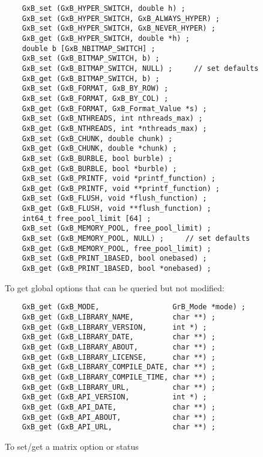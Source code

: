 \documentclass[12pt]{article}
\begin{document}
{    {\footnotesize
    \begin{verbatim}
    GxB_set (GxB_HYPER_SWITCH, double h) ;
    GxB_set (GxB_HYPER_SWITCH, GxB_ALWAYS_HYPER) ;
    GxB_set (GxB_HYPER_SWITCH, GxB_NEVER_HYPER) ;
    GxB_get (GxB_HYPER_SWITCH, double *h) ;
    double b [GxB_NBITMAP_SWITCH] ;
    GxB_set (GxB_BITMAP_SWITCH, b) ;
    GxB_set (GxB_BITMAP_SWITCH, NULL) ;     // set defaults
    GxB_get (GxB_BITMAP_SWITCH, b) ;
    GxB_set (GxB_FORMAT, GxB_BY_ROW) ;
    GxB_set (GxB_FORMAT, GxB_BY_COL) ;
    GxB_get (GxB_FORMAT, GxB_Format_Value *s) ;
    GxB_set (GxB_NTHREADS, int nthreads_max) ;
    GxB_get (GxB_NTHREADS, int *nthreads_max) ;
    GxB_set (GxB_CHUNK, double chunk) ;
    GxB_get (GxB_CHUNK, double *chunk) ;
    GxB_set (GxB_BURBLE, bool burble) ;
    GxB_get (GxB_BURBLE, bool *burble) ;
    GxB_set (GxB_PRINTF, void *printf_function) ;
    GxB_get (GxB_PRINTF, void **printf_function) ;
    GxB_set (GxB_FLUSH, void *flush_function) ;
    GxB_get (GxB_FLUSH, void **flush_function) ;
    int64_t free_pool_limit [64] ;
    GxB_set (GxB_MEMORY_POOL, free_pool_limit) ;
    GxB_set (GxB_MEMORY_POOL, NULL) ;     // set defaults
    GxB_get (GxB_MEMORY_POOL, free_pool_limit) ;
    GxB_set (GxB_PRINT_1BASED, bool onebased) ;
    GxB_get (GxB_PRINT_1BASED, bool *onebased) ; \end{verbatim} }

\noindent
To get global options that can be queried but not modified:

    {\footnotesize
    \begin{verbatim}
    GxB_get (GxB_MODE,                 GrB_Mode *mode) ;
    GxB_get (GxB_LIBRARY_NAME,         char **) ;
    GxB_get (GxB_LIBRARY_VERSION,      int *) ;
    GxB_get (GxB_LIBRARY_DATE,         char **) ;
    GxB_get (GxB_LIBRARY_ABOUT,        char **) ;
    GxB_get (GxB_LIBRARY_LICENSE,      char **) ;
    GxB_get (GxB_LIBRARY_COMPILE_DATE, char **) ;
    GxB_get (GxB_LIBRARY_COMPILE_TIME, char **) ;
    GxB_get (GxB_LIBRARY_URL,          char **) ;
    GxB_get (GxB_API_VERSION,          int *) ;
    GxB_get (GxB_API_DATE,             char **) ;
    GxB_get (GxB_API_ABOUT,            char **) ;
    GxB_get (GxB_API_URL,              char **) ; \end{verbatim} }

\noindent
To set/get a matrix option or status

}
\end{document}
